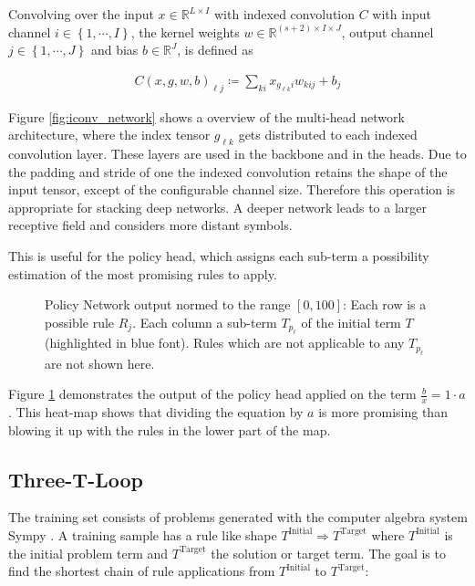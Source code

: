 \documentclass{scrartcl}
\theoremstyle{definition}
\begin{document}
Convolving over the input $x \in \mathbb{R}^{L\times I}$ with indexed convolution $C$ with input channel $i \in \left\{1,\cdots,I \right\}$,
the kernel weights $w \in \mathbb{R}^{\left( s+2 \right)\times I \times J}$, output channel $j \in \left\{1,\cdots,J\right\}$ and bias $b \in \mathbb{R}^J$,
is defined as

\begin{align}
	C\left( x, g, w, b \right)_{\ell j} \coloneqq \sum_{ki}x_{g_{\ell k}i} w_{kij}+b_j
\end{align}

Figure \ref{fig:iconv_network} shows a overview of the multi-head network architecture, where the index tensor $g_{\ell k}$ gets distributed to each indexed convolution layer.
These layers are used in the backbone and in the heads.
Due to the padding and stride of one the indexed convolution retains the shape of the input tensor, except of the configurable channel size.
Therefore this operation is appropriate for stacking deep networks.
A deeper network leads to a larger receptive field and considers more distant symbols.

This is useful for the policy head, which assigns each sub-term a possibility estimation of the most promising rules to apply.

\begin{figure}[!htbp]
	\centering
	
	\caption{Policy Network output normed to the range $[0,100]$: Each row is a possible rule $R_j$. Each column a sub-term $T_{p_\ell}$ of the initial term $T$ (highlighted in blue font).
	Rules which are not applicable to any $T_{p_\ell}$ are not shown here.
	}
	\label{fig:network_output}
\end{figure}

Figure \ref{fig:network_output} demonstrates the output of the policy head applied on the term $\frac{b}{x}=1\cdot a$.
This heat-map shows that dividing the equation by $a$ is more promising than blowing it up with the rules in the lower part of the map.


\subsection{Three-T-Loop}

The training set consists of problems generated with the computer algebra system Sympy \cite{10.7717/peerj-cs.103}.
A training sample has a rule like shape $T^\text{Initial} \Longrightarrow T^\text{Target}$ where $T^\text{Initial}$ is the initial problem term and $T^\text{Target}$ the solution or target term.
The goal is to find the shortest chain of rule applications from $T^\text{Initial}$ to $T^\text{Target}$:
\end{document}
